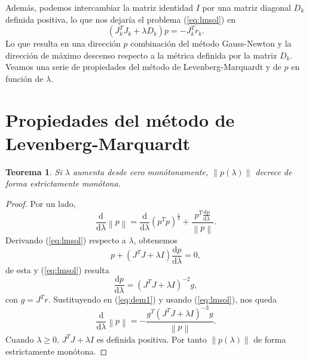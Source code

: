 \documentclass[11pt,a4paper]{book}
\newtheorem{theorem}{Teorema}[chapter]
\theoremstyle{definition}
\theoremstyle{remark}
\newcommand{\norm}[1]{\left\lVert#1\right\rVert}
\begin{document}
Además, podemos intercambiar la matriz identidad $I$ por una matriz diagonal $D_k$ definida positiva, lo que nos dejaría el problema (\ref{eq:lmsol}) en
\begin{equation}
	(J_k^TJ_k+\lambda D_k)p = -J_k^Tr_k.
\end{equation}
Lo que resulta en una dirección $p$ combinación del método Gauss-Newton y la dirección de máximo descenso respecto a la métrica definida por la matriz $D_k$.
Veamos una serie de propiedades del método de Levenberg-Marquardt y de $p$ en función de $\lambda$. 

\section{Propiedades del método de Levenberg-Marquardt}
\begin{theorem}
	Si $\lambda$ aumenta desde cero monótonamente, $\norm{p(\lambda)}$ decrece de forma estrictamente monótona.
\end{theorem}
\begin{proof}
	Por un lado,
	\begin{equation}
		\label{eq:dem1}
		\frac{\mathrm{d}}{\mathrm{d}\lambda}\norm{p}=
		\frac{\mathrm{d}}{\mathrm{d}\lambda}(p^Tp)^{\frac{1}{2}}+
		\frac{p^T\frac{\mathrm{d}p}{\mathrm{d}\lambda}}{\norm{p}}.
	\end{equation}
	Derivando (\ref{eq:lmsol}) respecto a $\lambda$, obtenemos
	\begin{equation}
		\label{eq:dem2}
		p + (J^TJ+\lambda I)\frac{\mathrm{d}p}{\mathrm{d}\lambda} = 0,
	\end{equation}
	de esta y (\ref{eq:lmsol}) resulta
	\begin{equation}
		\label{eq:dem3}
		\frac{\mathrm{d}p}{\mathrm{d}\lambda}=(J^TJ+\lambda I)^{-2}g,
	\end{equation}
	con $g=J^Tr$. Sustituyendo en (\ref{eq:dem1}) y usando (\ref{eq:lmsol}), nos queda
	\begin{equation}
		\frac{\mathrm{d}}{\mathrm{d}\lambda}\norm{p}=
		-\frac{g^T(J^TJ+\lambda I)^{-3}g}{\norm{p}}.
	\end{equation}
	Cuando $\lambda \geq 0,\, J^TJ+\lambda I$ es definida positiva. Por tanto $\norm{p(\lambda)}$ de forma estrictamente monótona.
\end{proof}
\end{document}
